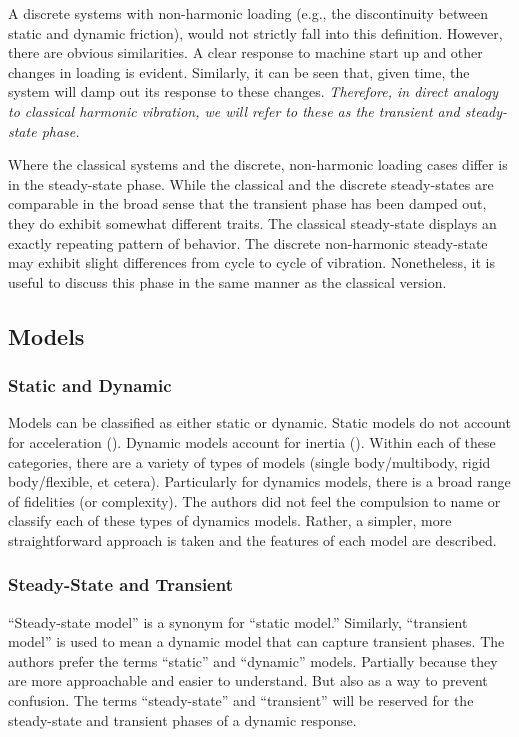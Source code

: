 A discrete systems with non-harmonic loading (e.g., the discontinuity between static and dynamic friction), would not strictly fall into this definition.  However, there are obvious similarities.  A clear response to machine start up and other changes in loading is evident.  Similarly, it can be seen that, given time, the system will damp out its response to these changes.  \emph{Therefore, in direct analogy to classical harmonic vibration, we will refer to these as the transient and steady-state phase.}

Where the classical systems and the discrete, non-harmonic loading cases differ is in the steady-state phase.  While the classical and the discrete steady-states are comparable in the broad sense that the transient phase has been damped out, they do exhibit somewhat different traits.  The classical steady-state displays an exactly repeating pattern of behavior.  The discrete non-harmonic steady-state may exhibit slight differences from cycle to cycle of vibration.  Nonetheless, it is useful to discuss this phase in the same manner as the classical version.

\subsection{Models}
\subsubsection{Static and Dynamic}
Models can be classified as either static or dynamic.  Static models do not account for acceleration (\staticforcebalance{}).  Dynamic models account for inertia (\dynamicforcebalance{}).  Within each of these categories, there are a variety of types of models (single body/multibody, rigid body/flexible, et cetera).  Particularly for dynamics models, there is a broad range of fidelities (or complexity).  The authors did not feel the compulsion to name or classify each of these types of dynamics models.  Rather, a simpler, more straightforward approach is taken and the features of each model are described.

\subsubsection{Steady-State and Transient}
``Steady-state model'' is a synonym for ``static model.'' Similarly, ``transient model'' is used to mean a dynamic model that can capture transient phases.  The authors prefer the terms ``static'' and ``dynamic'' models.  Partially because they are more approachable and easier to understand.  But also as a way to prevent confusion.  The terms ``steady-state'' and ``transient'' will be reserved for the steady-state and transient phases of a dynamic response.

